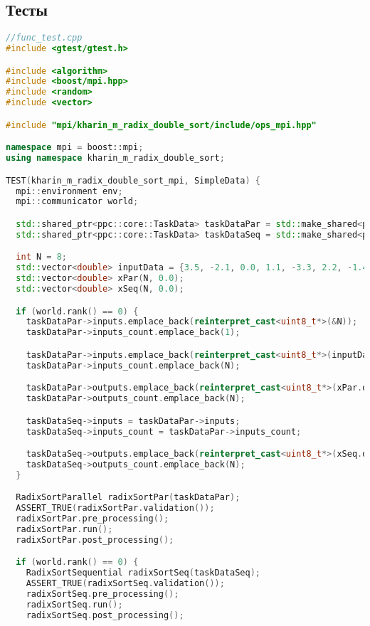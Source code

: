\documentclass[a4paper,12pt]{article}
\begin{document}
\subsection{Тесты}

\begin{lstlisting}[language=C++, caption={Тесты}]
//func_test.cpp
#include <gtest/gtest.h>

#include <algorithm>
#include <boost/mpi.hpp>
#include <random>
#include <vector>

#include "mpi/kharin_m_radix_double_sort/include/ops_mpi.hpp"

namespace mpi = boost::mpi;
using namespace kharin_m_radix_double_sort;

TEST(kharin_m_radix_double_sort_mpi, SimpleData) {
  mpi::environment env;
  mpi::communicator world;

  std::shared_ptr<ppc::core::TaskData> taskDataPar = std::make_shared<ppc::core::TaskData>();
  std::shared_ptr<ppc::core::TaskData> taskDataSeq = std::make_shared<ppc::core::TaskData>();

  int N = 8;
  std::vector<double> inputData = {3.5, -2.1, 0.0, 1.1, -3.3, 2.2, -1.4, 5.6};
  std::vector<double> xPar(N, 0.0);
  std::vector<double> xSeq(N, 0.0);

  if (world.rank() == 0) {
    taskDataPar->inputs.emplace_back(reinterpret_cast<uint8_t*>(&N));
    taskDataPar->inputs_count.emplace_back(1);

    taskDataPar->inputs.emplace_back(reinterpret_cast<uint8_t*>(inputData.data()));
    taskDataPar->inputs_count.emplace_back(N);

    taskDataPar->outputs.emplace_back(reinterpret_cast<uint8_t*>(xPar.data()));
    taskDataPar->outputs_count.emplace_back(N);

    taskDataSeq->inputs = taskDataPar->inputs;
    taskDataSeq->inputs_count = taskDataPar->inputs_count;

    taskDataSeq->outputs.emplace_back(reinterpret_cast<uint8_t*>(xSeq.data()));
    taskDataSeq->outputs_count.emplace_back(N);
  }

  RadixSortParallel radixSortPar(taskDataPar);
  ASSERT_TRUE(radixSortPar.validation());
  radixSortPar.pre_processing();
  radixSortPar.run();
  radixSortPar.post_processing();

  if (world.rank() == 0) {
    RadixSortSequential radixSortSeq(taskDataSeq);
    ASSERT_TRUE(radixSortSeq.validation());
    radixSortSeq.pre_processing();
    radixSortSeq.run();
    radixSortSeq.post_processing();


\end{lstlisting}
\end{document}
